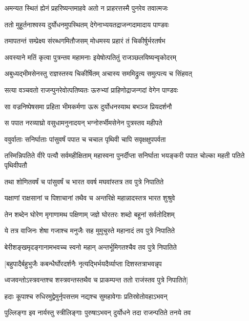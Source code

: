 \twolineshloka
{अमन्यत स्थितं ह्येनं प्रहरिष्यन्तमाहवे}
{अतो न प्राहरत्तस्मै पुनरेव तवात्मजः}


\twolineshloka
{ततो मुहूर्तनाश्वस्य दुर्योधनमुपस्थितम्}
{देगेनाभ्ययतद्राजन्गदामादाय पाण्डवः}


\twolineshloka
{तमापतन्तं सम्प्रेक्ष्य संरब्धगमितौजसम्}
{मोधमस्य प्रहारं तं चिकीर्षुर्भरतर्षभ}


\twolineshloka
{अवस्याने मतिं कृत्वा पुत्रन्तव महामनाः}
{इयेषोत्पतितुं राजञ्छलयिष्यन्वृकोदरम्}


\twolineshloka
{अबुध्यद्भीमसेनस्तु राज्ञस्तस्य चिकीर्षितम्}
{अचास्य सममिद्रुत्य समुत्पत्य च सिंहवत्}


\twolineshloka
{सत्या वञ्चवतो राजन्पुनरेवोत्पतिष्यतः}
{ऊरुभ्यां प्राहिणोद्राजन्गदां वेगेन पाण्डवः}


\twolineshloka
{सा वज्रनिष्पेषसमा प्रहिता भीमकर्मणा}
{ऊरू दुर्योधनस्याथ बभञ्ज प्रियदर्शनौ}


\twolineshloka
{स पपात नरव्याघ्रो वसुधामनुनादयन्}
{भग्नोरुर्भीमसेनेन पुत्रस्तव महीपते}


\twolineshloka
{ववुर्वाताः सनिर्घाताः पांसुवर्षं पपात च}
{चचाल पृथिवी चापि सवृक्षक्षुपपर्वता}


\threelineshloka
{तस्मिन्निपतिते वीरे पत्यौ सर्वमहीक्षिताम्}
{महास्वना पुनर्दीप्ता सनिर्घाता भयङ्करी}
{पपात चोल्का महती पतिते पृथिवीपतौ}


\twolineshloka
{तथा शोणितवर्षं च पांसुवर्षं च भारत}
{ववर्ष मघवांस्तत्र तव पुत्रे निपातिते}


\twolineshloka
{यक्षाणां राक्षसानां च पिशाचानां तथैव च}
{अन्तरिक्षे महान्नादस्तत्र भारत शुश्रुवे}


\twolineshloka
{तेन शब्देन घोरेण मृगाणामथ पक्षिणाम्}
{जज्ञे घोरतरः शब्दो बहूनां सर्वतोदिशम्}


\twolineshloka
{ये तत्र वाजिनः शेषा गजाश्च मनुजैः सह}
{मुमुचुस्ते महानादं तव पुत्रे निपातिते}


\twolineshloka
{बेरीशङ्खमृदङ्गानामभवच्च स्वनो महान्}
{अन्तर्भूमिगतश्चैव तव पुत्रे निपातिते}


\twolineshloka
{[बहुपादैर्बहुभुजैः कबन्धैर्घोरदर्शनैः}
{नृत्यद्भिर्भयदैर्व्याप्ता दिशस्तत्राभवन्नृप}


\twolineshloka
{ध्वजवन्तोऽस्त्रवन्तश्च शस्त्रवन्तस्तथैव च}
{प्राकम्पन्त ततो राजंस्तव पुत्रे निपातिते]}


\twolineshloka
{हदाः कूपाश्च रुधिरमुद्वेमुर्नृपसत्तम}
{नद्यश्च सुमहावेगाः प्रतिस्रोतोवहाऽभवन्}


\twolineshloka
{पुल्लिङ्गा इव नार्यस्तु स्त्रीलिङ्गाः पुरुषाऽभवन्}
{दुर्योधने तदा राजन्पतिते तनये तव}


